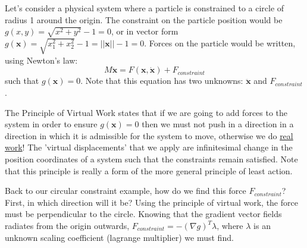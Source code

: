 \documentclass{article}
\begin{document}
Let's consider a physical system where a particle is constrained to a circle of radius 1 around the origin. The constraint on the particle position would be $g(x,y) = \sqrt{x^2+y^2} - 1 = 0$, or in vector form $g(\mathbf{x}) = \sqrt{x_1^2+x_2^2} - 1 = ||\mathbf{x}|| -1 = 0$. Forces on the particle would be written, using Newton's law:
\[
M \mathbf{\ddot{x}} = F(\mathbf{x}, \mathbf{\dot{x}}) + F_{constraint}
\]
such that $g(\mathbf{x}) = 0$. Note that this equation has two unknowns: $\mathbf{\ddot{x}}$ and $F_{constraint}$.

The Principle of Virtual Work states that if we are going to add forces to the system in order to ensure $g(\mathbf{x})=0$ then we must not push in a direction in a direction in which it is admissible for the system to move, otherwise we do \underline{real work}! The 'virtual displacements' that we apply are inﬁnitesimal change in the position coordinates of a system such that the constraints remain satisfied. Note that this principle is really a form of the more general principle of least action.

Back to our circular constraint example, how do we find this force $F_{constraint}$? First, in which direction will it be? Using the principle of virtual work, the force must be perpendicular to the circle. Knowing that the gradient vector fields radiates from the origin outwards, $F_{constraint} = - (\nabla g)^T \lambda$, where $\lambda$ is an unknown scaling coefficient (lagrange multiplier) we must find. 
\end{document}
